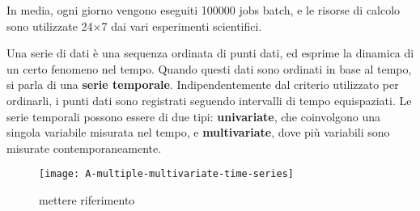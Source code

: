 In media, ogni giorno vengono eseguiti 100000 jobs batch, e le risorse di
calcolo sono utilizzate 24×7 dai vari esperimenti scientifici.


Una serie di dati è una sequenza ordinata di punti dati, ed esprime la
dinamica di un certo fenomeno nel tempo. Quando questi dati sono ordinati 
in base al tempo, si parla di una \textbf{serie temporale}. Indipendentemente dal
criterio utilizzato per ordinarli, i punti dati sono registrati seguendo
intervalli di tempo equispaziati. Le serie temporali
possono essere di due tipi: \textbf{univariate}, che coinvolgono una singola variabile
misurata nel tempo, e \textbf{multivariate}, dove più variabili sono misurate
contemporaneamente.


\begin{figure}[ht]
    \centering
    \texttt{[image: A-multiple-multivariate-time-series]}
    \caption[legenda elenco figure]{mettere riferimento}\label{fig:prima}
\end{figure}
